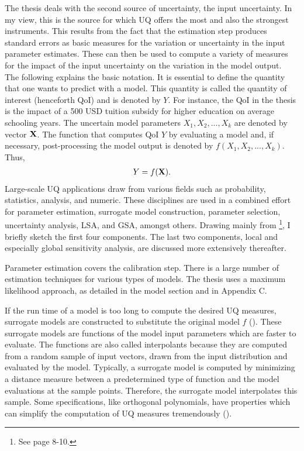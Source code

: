 \documentclass[a4paper,12pt]{article}
\begin{document}
The thesis deals with the second source of uncertainty, the input uncertainty. In my view, this is the source for which UQ offers the most and also the strongest instruments. This results from the fact that the estimation step produces standard errors as basic measures for the variation or uncertainty in the input parameter estimates. These can then be used to compute a variety of measures for the impact of the input uncertainty on the variation in the model output.\\
\newline
The following explains the basic notation. It is essential to define the quantity that one wants to predict with a model. This quantity is called the quantity of interest (henceforth QoI) and is denoted by $Y$. For instance, the QoI in the thesis is the impact of a 500 USD tuition subsidy for higher education on average schooling years. The uncertain model parameters $X_1, X_2, ..., X_k$ are denoted by vector $\bold{X}$. The function that computes QoI $Y$ by evaluating a  model and, if necessary, post-processing the model output is denoted by $f(X_1, X_2, ..., X_k)$. Thus,
\begin{align}
Y = f(\bold{X}).
\end{align}
Large-scale UQ applications draw from various fields such as probability, statistics, analysis, and numeric. These disciplines are used in a combined effort for parameter estimation, surrogate model construction, parameter selection, uncertainty analysis, LSA, and GSA, amongst others. Drawing mainly from \cite{Smith.2014}\footnote{See page 8-10.}, I briefly sketch the first four components. The last two components, local and especially global sensitivity analysis, are discussed more extensively thereafter.

Parameter estimation covers the calibration step. There is a large number of estimation techniques for various types of models. The thesis uses a maximum likelihood approach, as detailed in the model section and in Appendix C.

If the run time of a model is too long to compute the desired UQ measures, surrogate models are constructed to substitute the original model $f$ (\cite{mcbride2019overview}). These surrogate models are functions of the model input parameters which are faster to evaluate. The functions are also called interpolants because they are computed from a random sample of input vectors, drawn from the input distribution and evaluated by the model. Typically, a surrogate model is computed by minimizing a distance measure between a predetermined type of function and the model evaluations at the sample points. Therefore, the surrogate model interpolates this sample. Some specifications, like orthogonal polynomials, have properties which can simplify the computation of UQ measures tremendously (\cite{xiu2010numerical}).
\end{document}
